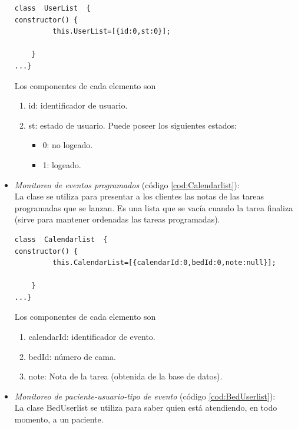 \begin{itemize}
\begin{lstlisting}[label=cod:Userlist,caption=  Clase Userlist]
class  UserList  {   
constructor() {
         this.UserList=[{id:0,st:0}];                
        
    }
...}
\end{lstlisting}

Los componentes de cada elemento son 
	\begin{enumerate}
		\item id: identificador de usuario.
		\item st: estado de usuario. Puede poseer los siguientes estados: 
			\begin{itemize}
				\item 0: no logeado.
				\item 1: logeado.
			\end{itemize}
	\end{enumerate}




\item \textit{ Monitoreo de eventos programados} (código \ref{cod:Calendarlist}):\\
La clase se utiliza para presentar a los clientes las notas de las tareas programadas que se lanzan. Es una lista que se vacía cuando la tarea finaliza (sirve para mantener ordenadas las tareas programadas).

\begin{lstlisting}[label=cod:Calendarlist,caption=  Clase CalendarList]
class  Calendarlist  {   
constructor() {
         this.CalendarList=[{calendarId:0,bedId:0,note:null}];                
        
    }
...}
\end{lstlisting}

Los componentes de cada elemento son 
	\begin{enumerate}
		\item calendarId: identificador de evento.
		\item bedId: número de cama.
		\item note: Nota de la tarea (obtenida de la base de datos).		

	\end{enumerate}




\item \textit{ Monitoreo de paciente-usuario-tipo de evento} (código \ref{cod:BedUserlist}):\\
La clase BedUserlist se utiliza para saber quien está atendiendo, en todo momento, a un paciente.


\end{itemize}

